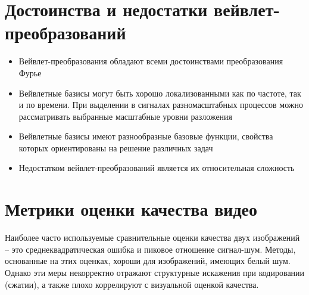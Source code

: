 \section{Достоинства и недостатки вейвлет-преобразований}
\begin{itemize}
 \item Вейвлет-преобразования обладают всеми достоинствами преобразования Фурье
 \item Вейвлетные базисы могут быть хорошо локализованными как по частоте, так и по времени. 
 При выделении в сигналах разномасштабных процессов можно рассматривать выбранные масштабные уровни разложения
 \item Вейвлетные базисы имеют разнообразные базовые функции, свойства которых ориентированы на решение различных задач
 \item Недостатком вейвлет-преобразований является их относительная сложность
\end{itemize}

\section{Метрики оценки качества видео}

Наиболее часто используемые сравнительные оценки качества двух изображений – 
это среднеквадратическая ошибка и пиковое отношение сигнал-шум. 
Методы, основанные на этих оценках, хороши для изображений, имеющих 
белый шум. Однако эти меры некорректно отражают структурные искажения при 
кодировании (сжатии), а также плохо коррелируют с визуальной оценкой 
качества. 

